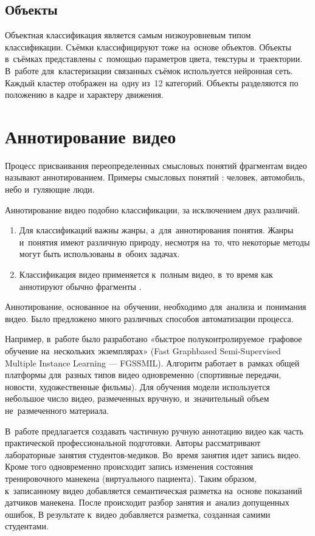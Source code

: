 \subsection{Объекты}

Объектная классификация является самым низкоуровневым типом классификации.
Съёмки классифицируют тоже на~основе объектов.
Объекты в~съёмках представлены с~помощью параметров цвета, текстуры и~траектории.
В~работе \cite{Hong:2005} для~кластеризации связанных съёмок
используется нейронная сеть.
Каждый кластер отображен на~одну из~12 категорий.
Объекты разделяются по положению в кадре и характеру движения.


\section{Аннотирование видео}

Процесс присваивания переопределенных смысловых понятий фрагментам видео
называют аннотированием. Примеры смысловых понятий : человек,
автомобиль, небо и~гуляющие люди.

Аннотирование видео подобно классификации, за исключением двух различий.
\begin{enumerate}
    \item Для классификаций важны жанры, а~для~аннотирования понятия.
        Жанры и~понятия имеют различную природу, несмотря на~то,
        что некоторые методы могут быть использованы в~обоих задачах.
    \item Классификация видео применяется к~полным видео,
        в~то время как аннотируют обычно фрагменты \cite{Yang:2007}.
\end{enumerate}

Аннотирование, основанное на~обучении, необходимо для~анализа
и~понимания видео. Было предложено много различных способов
автоматизации процесса.

Например, в~работе \cite{Zhang:2012} было
разработано «быстрое полуконтролируемое\
графовое обучение на~нескольких экземплярах»
(Fast Graphbased Semi-Supervised Multiple Instance Learning — FGSSMIL).
Алгоритм работает в~рамках общей платформы для~разных типов видео одновременно
(спортивные передачи, новости, художественные фильмы).
Для обучения модели используется небольшое число видео, размеченных вручную,
и~значительный объем не~размеченного материала.

В~работе \cite{Weal:2012} предлагается создавать
частичную ручную аннотацию видео
как часть практической профессиональной подготовки.
Авторы рассматривают лабораторные занятия студентов-медиков.
Во~время занятия идет запись видео.
Кроме того одновременно происходит запись изменения состояния
тренировочного манекена (виртуального пациента).
Таким образом, к~записанному видео добавляется семантическая разметка
на~основе показаний датчиков манекена.
После происходит разбор занятия и~анализ допущенных ошибок,
В результате к~видео добавляется разметка, созданная самими студентами.


